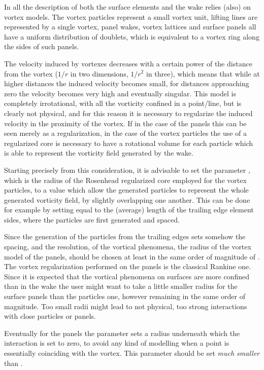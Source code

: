 In \DUST{} all the description of both the surface elements and the wake relies (also) on vortex models. The vortex particles represent a small vortex unit, lifting lines are represented by a single vortex, panel wakes, vortex lattices and surface panels all have a uniform distribution of doublets, which is equivalent to a vortex ring along the sides of such panels. 

The velocity induced by vortexes decreases with a certain power of the distance from the vortex ($1/r$ in two dimensions, $1/r^2$ in three), which means that while at higher distances the induced velocity becomes small, for distances approaching zero the velocity becomes very high and eventually singular. This model is completely irrotational, with all the vorticity confined in a point/line, but is clearly not physical, and for this reason it is necessary to regularize the induced velocity in the proximity of the vortex. If in the case of the panels this can be seen merely as a regularization, in the case of the vortex particles the use of a regularized core is necessary to have a rotational volume for each particle which is able to represent the vorticity field generated by the wake. 

Starting precisely from this consideration, it is advisable to set the parameter , which is the radius of the Rosenhead regularized core employed for the vortex particles, to a value which allow the generated particles to represent the whole generated vorticity field, by slightly overlapping one another. This can be done for example by setting  equal to the (average) length of the trailing edge element sides, where the particles are first generated and spaced.

Since the generation of the particles from the trailing edges sets somehow the spacing, and the resolution, of the vortical phenomena, the radius of the vortex model of the panels,  should be chosen at least in the same order of magnitude of . The vortex regularization performed on the panels is the classical Rankine one. Since it is expected that the vortical phenomena on surfaces are more confined than in the wake the user might want to take a little smaller radius for the surface panels than the particles one, however remaining in the same order of magnitude. Too small radii might lead to not physical, too strong interactions with close particles or panels.

Eventually for the panels the parameter  sets a radius underneath which the interaction is set to zero, to avoid any kind of modelling when a point is essentially coinciding with the vortex. This parameter should be set \emph{much smaller} than . 



